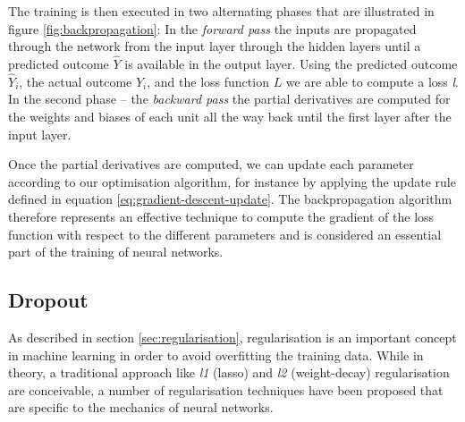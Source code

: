 The training is then executed in two alternating phases that are illustrated in figure \ref{fig:backpropagation}: In the \emph{forward pass} the inputs are propagated through the network from the input layer through the hidden layers until a predicted outcome $\hat{Y}$ is available in the output layer. Using the predicted outcome $\hat{Y}_i$, the actual outcome $Y_i$, and the loss function $L$ we are able to compute a loss \emph{l}.
In the second phase -- the \emph{backward pass} the partial derivatives are computed for the weights and biases of each unit all the way back until the first layer after the input layer. 

Once the partial derivatives are computed, we can update each parameter according to our optimisation algorithm, for instance by applying the update rule defined in equation \ref{eq:gradient-descent-update}. 
The backpropagation algorithm therefore represents an effective technique to compute the gradient of the loss function with respect to the different parameters and is considered an essential part of the training of neural networks. 


\subsection{Dropout} \label{sec:dropout}
As described in section \ref{sec:regularisation}, regularisation is an important concept in machine learning in order to avoid overfitting the training data. While in theory, a traditional approach like \emph{l1} (lasso) and \emph{l2} (weight-decay) regularisation are conceivable, a number of regularisation techniques have been proposed that are specific to the mechanics of neural networks. 

